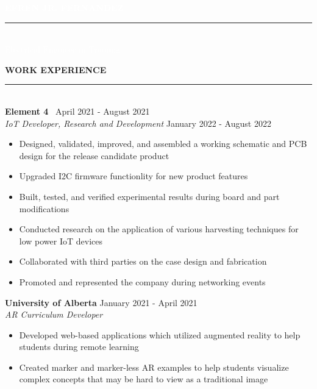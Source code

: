 \documentclass[10pt,letterpaper]{article}
\newcommand{\header}[2] {
    \vspace{10pt}
        {\LARGE\faIcon{#1}}\hspace{0.5em}\textbf{\LARGE{\uppercase{#2} } }
        \vspace{-5pt} \\
        \rule{0.1 \textwidth}{1pt}\hfill \\
}
\newcommand{\ExperienceHeader}[3] {
    \textbf{\large{#1} }
    \hfill
    {#3}\\
    \textit{#2}\\
    \vspace{-1em}
}
\begin{document}
\begin{paracol}{2}
\begin{rightcolumn}
\begin{center}
\begin{tcolorbox}[colback=red!54!green!71!blue!79,%
            colframe=black,
            width= 0.95\columnwidth,
           ]
\begin{center}
                \huge{ \textbf{ \textcolor{white}{\uppercase{Efren Jr. Fernandez} } } } \\
                \vspace{-0.8em}
                \textcolor{white}{ \rule{0.45\textwidth}{1pt} }\\
                \large{ \textcolor{white}{Electrical Engineer in Training} }
           \end{center}
        \end{tcolorbox}  
    \end{center} 
    \header{briefcase}{Work Experience}
    \textbf{\large{Element 4} }
    \hfill\
    {April 2021 - August 2021}\\
    \textit{IoT Developer, Research and Development}
    \hfill
    {January 2022 - August 2022}\\
    \vspace{-1em}
    \begin{itemize}
        \item Designed, validated, improved, and assembled a working schematic and PCB design for the release candidate product
        \item Upgraded I2C firmware functionlity for new product features
        \item Built, tested, and verified experimental results during board and part \\modifications
        \item Conducted research on the application of various harvesting techniques for low power IoT devices
        \item Collaborated with third parties on the case design and fabrication
        \item Promoted and represented the company during networking events
    \end{itemize}
    \vspace{5pt}
    \ExperienceHeader{University of Alberta}{AR Curriculum Developer}{January 2021 - April 2021}
    \begin{itemize}
        \item Developed web-based applications which utilized augmented reality to help students during remote learning
        \item Created marker and marker-less AR examples to help students visualize complex concepts that may be hard to view as a traditional image

\end{itemize}
\end{rightcolumn}
\end{paracol}
\end{document}
